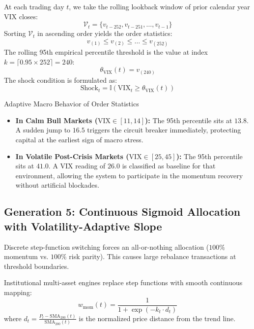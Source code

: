 \documentclass[11pt,a4paper]{article}
\begin{document}
At each trading day $t$, we take the rolling lookback window of prior calendar year VIX closes:
\begin{equation}
\mathcal{V}_t = \{v_{t-252}, v_{t-251}, \dots, v_{t-1}\}
\end{equation}
Sorting $\mathcal{V}_t$ in ascending order yields the order statistics:
\begin{equation}
v_{(1)} \le v_{(2)} \le \dots \le v_{(252)}
\end{equation}
The rolling 95th empirical percentile threshold is the value at index $k = \lceil 0.95 \times 252 \rceil = 240$:
\begin{equation}
\theta_{\text{VIX}}(t) = v_{(240)}
\end{equation}
The shock condition is formulated as:
\begin{equation}
\text{Shock}_t = \mathbb{I}\left( \text{VIX}_t \ge \theta_{\text{VIX}}(t) \right)
\end{equation}
\begin{quantbox}{Adaptive Macro Behavior of Order Statistics}
\begin{itemize}[leftmargin=*]
    \item \textbf{In Calm Bull Markets ($\text{VIX} \in [11, 14]$):} The 95th percentile sits at $13.8$. A sudden jump to $16.5$ triggers the circuit breaker immediately, protecting capital at the earliest sign of macro stress.
    \item \textbf{In Volatile Post-Crisis Markets ($\text{VIX} \in [25, 45]$):} The 95th percentile sits at $41.0$. A VIX reading of $26.0$ is classified as baseline for that environment, allowing the system to participate in the momentum recovery without artificial blockades.
\end{itemize}
\end{quantbox}

\subsection{Generation 5: Continuous Sigmoid Allocation with Volatility-Adaptive Slope}
Discrete step-function switching forces an all-or-nothing allocation ($100\%$ momentum vs. $100\%$ risk parity). This causes large rebalance transactions at threshold boundaries.

Institutional multi-asset engines replace step functions with smooth continuous mapping:
\begin{equation}
w_{\text{mom}}(t) = \frac{1}{1 + \exp\left( -k_t \cdot d_t \right)}
\end{equation}
where $d_t = \frac{P_t - \text{SMA}_{200}(t)}{\text{SMA}_{200}(t)}$ is the normalized price distance from the trend line.
\end{document}
